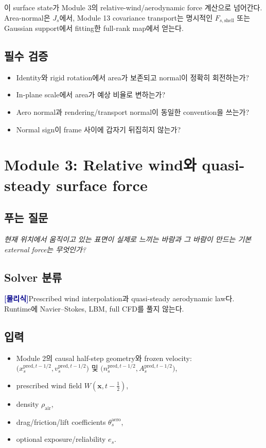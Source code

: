 \documentclass[11pt,a4paper]{article}
\newcommand{\physics}{\textcolor{darkblue}{\textbf{[물리식]}}}
\begin{document}
이 surface state가 Module 3의 relative-wind/aerodynamic force 계산으로 넘어간다.
Area-normal은 \(J_s\)에서, Module 13 covariance transport는
명시적인 \(F_{s,\mathrm{shell}}\) 또는 Gaussian support에서 fitting한 full-rank map에서 얻는다.

\subsection*{필수 검증}

\begin{itemize}[leftmargin=1.5em]
  \item Identity와 rigid rotation에서 area가 보존되고 normal이 정확히 회전하는가?
  \item In-plane scale에서 area가 예상 비율로 변하는가?
  \item Aero normal과 rendering/transport normal이 동일한 convention을 쓰는가?
  \item Normal sign이 frame 사이에 갑자기 뒤집히지 않는가?
\end{itemize}

\section{Module 3: Relative wind와 quasi-steady surface force}

\subsection*{푸는 질문}

\emph{현재 위치에서 움직이고 있는 표면이 실제로 느끼는 바람과
그 바람이 만드는 기본 external force는 무엇인가?}

\subsection*{Solver 분류}

\physics Prescribed wind interpolation과 quasi-steady aerodynamic law다.
Runtime에 Navier--Stokes, LBM, full CFD를 풀지 않는다.

\subsection*{입력}

\begin{itemize}[leftmargin=1.5em]
  \item Module 2의 causal half-step geometry와 frozen velocity:
  \(
  \bigl(x_s^{\mathrm{pred},t-1/2},v_s^{\mathrm{pred},t-1/2}\bigr)
  \) 및
  \(
  \bigl(n_s^{\mathrm{pred},t-1/2},A_s^{\mathrm{pred},t-1/2}\bigr)
  \),
  \item prescribed wind field \(W(\mathbf x,t-\tfrac12)\),
  \item density \(\rho_{\mathrm{air}}\),
  \item drag/friction/lift coefficients \(\theta_s^{\mathrm{aero}}\),
  \item optional exposure/reliability \(e_s\).
\end{itemize}
\end{document}

